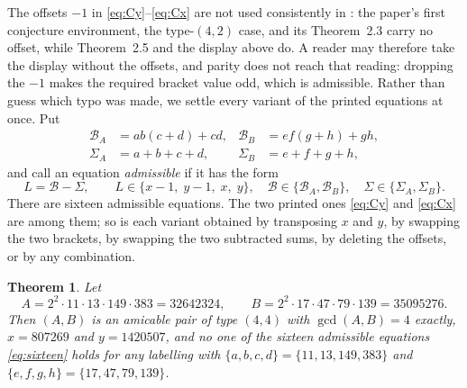 \documentclass[11pt]{amsart}
\newtheorem{theorem}{Theorem}
\theoremstyle{remark}
\begin{document}
The offsets $-1$ in \eqref{eq:Cy}--\eqref{eq:Cx} are not used consistently in
\cite{MA}: the paper's first conjecture environment, the type-$(4,2)$ case, and
its Theorem~2.3 carry no offset, while Theorem~2.5 and the display above do. A
reader may therefore take the display without the offsets, and parity does not
reach that reading: dropping the $-1$ makes the required bracket value odd,
which is admissible. Rather than guess which typo was made, we settle every
variant of the printed equations at once. Put
\begin{align*}
 \mathcal B_A&=ab(c+d)+cd, & \mathcal B_B&=ef(g+h)+gh,\\
 \Sigma_A&=a+b+c+d, & \Sigma_B&=e+f+g+h,
\end{align*}
and call an equation \emph{admissible} if it has the form
\begin{equation}\label{eq:sixteen}
 L=\mathcal B-\Sigma,
 \qquad
 L\in\{x-1,\;y-1,\;x,\;y\},\quad
 \mathcal B\in\{\mathcal B_A,\mathcal B_B\},\quad
 \Sigma\in\{\Sigma_A,\Sigma_B\}.
\end{equation}
There are sixteen admissible equations. The two printed ones \eqref{eq:Cy} and
\eqref{eq:Cx} are among them; so is each variant obtained by transposing $x$ and
$y$, by swapping the two brackets, by swapping the two subtracted sums, by
deleting the offsets, or by any combination.

\begin{theorem}\label{thm:witness}
Let
\[
 A=2^2\cdot11\cdot13\cdot149\cdot383=32642324,
 \qquad
 B=2^2\cdot17\cdot47\cdot79\cdot139=35095276.
\]
Then $(A,B)$ is an amicable pair of type $(4,4)$ with $\gcd(A,B)=4$ exactly,
$x=807269$ and $y=1420507$, and \emph{no} one of the sixteen admissible
equations \eqref{eq:sixteen} holds for \emph{any} labelling with
$\{a,b,c,d\}=\{11,13,149,383\}$ and $\{e,f,g,h\}=\{17,47,79,139\}$.
\end{theorem}
\end{document}

